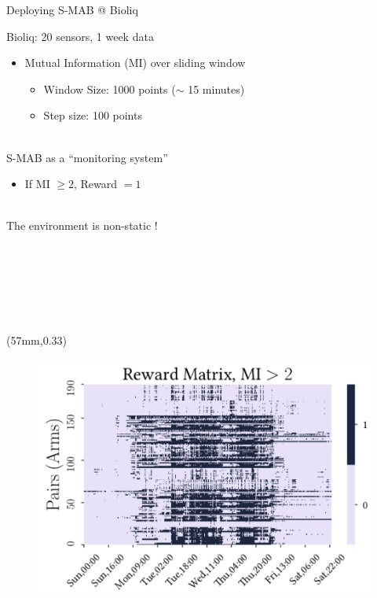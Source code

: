 \documentclass[16pt,usenames,dvipsnames, notheorems]{beamer}
\theoremstyle{definition}
\theoremstyle{example}
\theoremstyle{plain}
\begin{document}
\begin{frame}{Deploying S-MAB @ Bioliq}

Bioliq: 20 sensors, 1 week data
\begin{itemize}
	\item Mutual Information (MI) over sliding window  
	\begin{itemize}
		\item Window Size: 1000 points ($\sim$ 15 minutes)
		\item Step size: 100 points 
	\end{itemize}
\end{itemize}

~\\

S-MAB as a ``monitoring system''
\begin{itemize}
	\item If MI $\geq 2$, Reward $= 1$ 
\end{itemize}
~\\

The environment is non-static ! %

~\\

~\\

~\\

~\\

~\\

\begin{textblock*}{70mm}(57mm,0.33\textheight)
	\begin{figure}
		\includegraphics[width=\textwidth]{figures/reward_heatmap_100_s.pdf}
	\end{figure}
\end{textblock*}

\end{frame}
\end{document}
